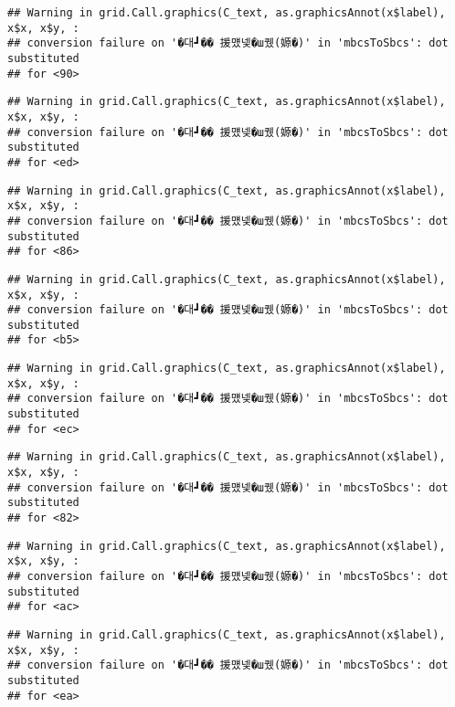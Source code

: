 \documentclass[
]{article}
\begin{document}
\begin{verbatim}
## Warning in grid.Call.graphics(C_text, as.graphicsAnnot(x$label), x$x, x$y, :
## conversion failure on '�대┛�� 援먰넻�ш퀬(嫄�)' in 'mbcsToSbcs': dot substituted
## for <90>
\end{verbatim}

\begin{verbatim}
## Warning in grid.Call.graphics(C_text, as.graphicsAnnot(x$label), x$x, x$y, :
## conversion failure on '�대┛�� 援먰넻�ш퀬(嫄�)' in 'mbcsToSbcs': dot substituted
## for <ed>
\end{verbatim}

\begin{verbatim}
## Warning in grid.Call.graphics(C_text, as.graphicsAnnot(x$label), x$x, x$y, :
## conversion failure on '�대┛�� 援먰넻�ш퀬(嫄�)' in 'mbcsToSbcs': dot substituted
## for <86>
\end{verbatim}

\begin{verbatim}
## Warning in grid.Call.graphics(C_text, as.graphicsAnnot(x$label), x$x, x$y, :
## conversion failure on '�대┛�� 援먰넻�ш퀬(嫄�)' in 'mbcsToSbcs': dot substituted
## for <b5>
\end{verbatim}

\begin{verbatim}
## Warning in grid.Call.graphics(C_text, as.graphicsAnnot(x$label), x$x, x$y, :
## conversion failure on '�대┛�� 援먰넻�ш퀬(嫄�)' in 'mbcsToSbcs': dot substituted
## for <ec>
\end{verbatim}

\begin{verbatim}
## Warning in grid.Call.graphics(C_text, as.graphicsAnnot(x$label), x$x, x$y, :
## conversion failure on '�대┛�� 援먰넻�ш퀬(嫄�)' in 'mbcsToSbcs': dot substituted
## for <82>
\end{verbatim}

\begin{verbatim}
## Warning in grid.Call.graphics(C_text, as.graphicsAnnot(x$label), x$x, x$y, :
## conversion failure on '�대┛�� 援먰넻�ш퀬(嫄�)' in 'mbcsToSbcs': dot substituted
## for <ac>
\end{verbatim}

\begin{verbatim}
## Warning in grid.Call.graphics(C_text, as.graphicsAnnot(x$label), x$x, x$y, :
## conversion failure on '�대┛�� 援먰넻�ш퀬(嫄�)' in 'mbcsToSbcs': dot substituted
## for <ea>
\end{verbatim}
\end{document}
